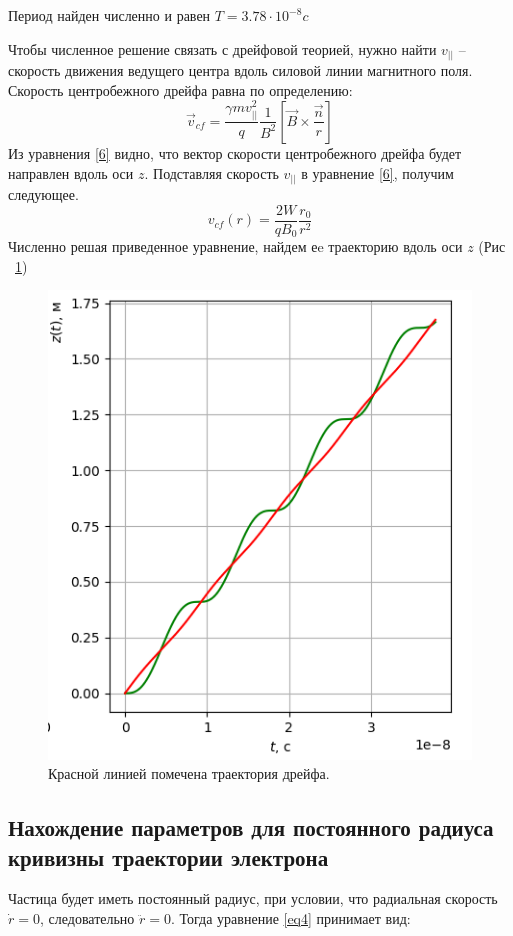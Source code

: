 Период найден численно и равен $T = 3.78 \cdot 10^{-8} c $
\par
Чтобы численное решение связать с дрейфовой теорией, нужно найти $v_{||}$ -- скорость движения ведущего центра вдоль силовой линии магнитного поля.
Скорость центробежного дрейфа равна по определению:
\begin{equation}
    \Vec{v}_{cf} = \frac{\gamma m v_{||}^2}{q} \frac{1}{B^2} \left[\Vec{B}\times \frac{\Vec{n}}{r}\right] \label{6}
\end{equation}
Из уравнения \eqref{6} видно, что вектор скорости центробежного дрейфа будет направлен вдоль оси $z$.
Подставляя скорость $v_{||}$ в уравнение \eqref{6}, получим следующее.
\begin{equation}
   v_{cf}(r) = \frac{2W}{q B_0} \frac{r_0}{r^2}
\end{equation}
Численно решая приведенное уравнение, найдем еe траекторию вдоль оси $z$ (Рис ~\ref{fig:2})
\begin{figure}[h]
    \centering
    \includegraphics[width=0.3\linewidth]{../prog/screen1.png}\caption{Красной линией помечена траектория дрейфа.}\label{fig:2}
\end{figure}
\newpage
\subsection{Нахождение параметров для постоянного радиуса кривизны траектории электрона}

Частица будет иметь постоянный радиус, при условии, что радиальная скорость $\dot{r} = 0$, следовательно $\ddot{r} = 0$. Тогда уравнение \eqref{eq4} принимает вид:

